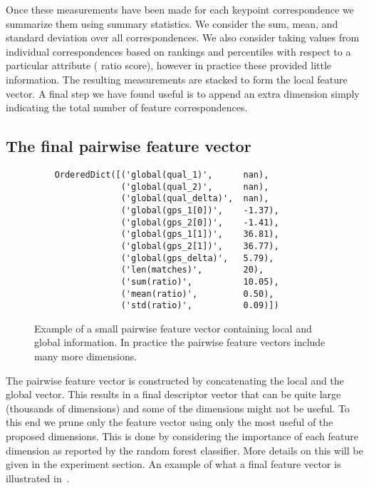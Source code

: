 Once these measurements have been made for each keypoint correspondence we
  summarize them using summary statistics.
We consider the sum, mean, and standard deviation over all correspondences.
We also consider taking values from individual correspondences based on
  rankings and percentiles with respect to a particular attribute (\eg{} ratio
  score), however in practice these provided little information.
The resulting measurements are stacked to form the local feature vector.
A final step we have found useful is to append an extra dimension simply
  indicating the total number of feature correspondences.


\subsection{The final pairwise feature vector}

\begin{figure}
\begin{verbatim}
    OrderedDict([('global(qual_1)',      nan),
                 ('global(qual_2)',      nan),
                 ('global(qual_delta)',  nan),
                 ('global(gps_1[0])',    -1.37),
                 ('global(gps_2[0])',    -1.41),
                 ('global(gps_1[1])',    36.81),
                 ('global(gps_2[1])',    36.77),
                 ('global(gps_delta)',   5.79),
                 ('len(matches)',        20),
                 ('sum(ratio)',          10.05),
                 ('mean(ratio)',         0.50),
                 ('std(ratio)',          0.09)])
\end{verbatim}
\caption[A pairwise feature vector]{
Example of a small pairwise feature vector containing local and global
information. In practice the pairwise feature vectors include many more
dimensions.
}
\label{fig:PairFeatVec}
\end{figure}

The pairwise feature vector is constructed by concatenating the local and the
  global vector.
This results in a final descriptor vector that can be quite large (thousands
  of dimensions) and some of the dimensions might not be useful.
To this end we prune only the feature vector using only the most useful of the
  proposed dimensions.
This is done by considering the importance of each feature dimension as
  reported by the random forest classifier.
More details on this will be given in the experiment section.
An example of what a final feature vector is illustrated
  in~.


